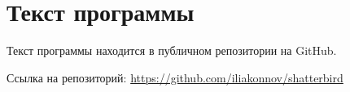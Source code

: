 \documentclass[12pt,a4paper]{article}
\begin{document}

	
	

	\clearpage
		\renewcommand*\contentsname{\centering СОДЕРЖАНИЕ}
		\tableofcontents
	\clearpage

	\section{Текст программы}
	Текст программы находится в публичном репозитории на GitHub.
	
	Ссылка на репозиторий: \url{https://github.com/iliakonnov/shatterbird}

\end{document}
